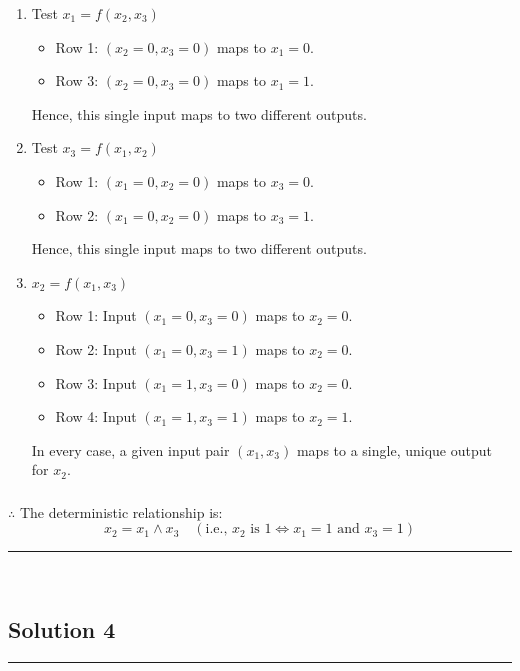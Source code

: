 \documentclass{article}
\begin{document}
\begin{enumerate}
    \item Test $x_1 = f(x_2, x_3)$
    \begin{itemize}
        \item Row 1: $(x_2=0, x_3=0)$ maps to $x_1=0$.
        \item Row 3: $(x_2=0, x_3=0)$ maps to $x_1=1$.
    \end{itemize}
    Hence, this single input maps to two different outputs.

    \item Test $x_3 = f(x_1, x_2)$
    \begin{itemize}
        \item Row 1: $(x_1=0, x_2=0)$ maps to $x_3=0$.
        \item Row 2: $(x_1=0, x_2=0)$ maps to $x_3=1$.
    \end{itemize}
    Hence, this single input maps to two different outputs.

    \item $x_2 = f(x_1, x_3)$
    \begin{itemize}
        \item Row 1: Input $(x_1=0, x_3=0)$ maps to $x_2=0$.
        \item Row 2: Input $(x_1=0, x_3=1)$ maps to $x_2=0$.
        \item Row 3: Input $(x_1=1, x_3=0)$ maps to $x_2=0$.
        \item Row 4: Input $(x_1=1, x_3=1)$ maps to $x_2=1$.
    \end{itemize}
    In every case, a given input pair $(x_1, x_3)$ maps to a single, unique output for $x_2$.
\end{enumerate}

\subsubsection*{\normalfont}{$\therefore$ The deterministic relationship is:} 
$$x_2 = x_1 \land x_3 \quad (\text{i.e., }x_2 \text{ is } 1 \iff x_1=1 \text{ and } x_3=1)$$

\noindent\rule{\textwidth}{0.4pt}\\

\newpage

\subsection*{Solution 4}
\noindent\rule{\textwidth}{0.4pt}\\
\end{document}
